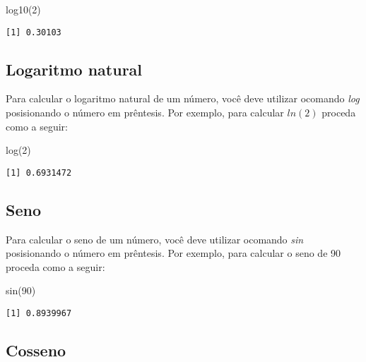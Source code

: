 \documentclass[
  letterpaper,
  DIV=11,
  numbers=noendperiod]{scrreprt}
\newenvironment{Shaded}{\begin{snugshade}}{\end{snugshade}}
\newcommand{\DecValTok}[1]{\textcolor[rgb]{0.68,0.00,0.00}{#1}}
\newcommand{\FunctionTok}[1]{\textcolor[rgb]{0.28,0.35,0.67}{#1}}
\newcommand{\NormalTok}[1]{\textcolor[rgb]{0.00,0.23,0.31}{#1}}
\begin{document}
\begin{Shaded}
\begin{Highlighting}[]
\FunctionTok{log10}\NormalTok{(}\DecValTok{2}\NormalTok{)}
\end{Highlighting}
\end{Shaded}

\begin{verbatim}
[1] 0.30103
\end{verbatim}

\subsection{Logaritmo natural}\label{logaritmo-natural}

Para calcular o logaritmo natural de um número, você deve utilizar
ocomando \emph{log} posisionando o número em prêntesis. Por exemplo,
para calcular \(ln(2)\) proceda como a seguir:

\begin{Shaded}
\begin{Highlighting}[]
\FunctionTok{log}\NormalTok{(}\DecValTok{2}\NormalTok{)}
\end{Highlighting}
\end{Shaded}

\begin{verbatim}
[1] 0.6931472
\end{verbatim}

\subsection{Seno}\label{seno}

Para calcular o seno de um número, você deve utilizar ocomando
\emph{sin} posisionando o número em prêntesis. Por exemplo, para
calcular o seno de 90 proceda como a seguir:

\begin{Shaded}
\begin{Highlighting}[]
\FunctionTok{sin}\NormalTok{(}\DecValTok{90}\NormalTok{)}
\end{Highlighting}
\end{Shaded}

\begin{verbatim}
[1] 0.8939967
\end{verbatim}

\subsection{Cosseno}\label{cosseno}
\end{document}
